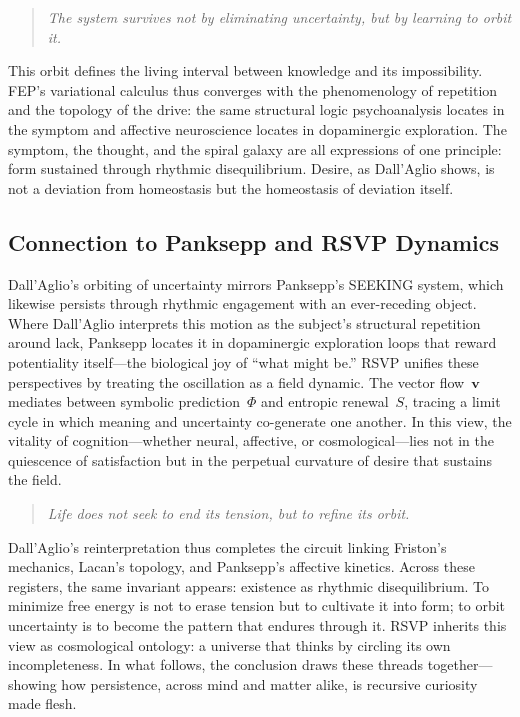 \documentclass[12pt,a4paper]{article}
\begin{document}
\begin{quote}
\textit{The system survives not by eliminating uncertainty, but by learning to orbit it.}
\end{quote}

This orbit defines the living interval between knowledge and its impossibility.  
FEP’s variational calculus thus converges with the phenomenology of repetition and the topology of the drive: the same structural logic psychoanalysis locates in the symptom and affective neuroscience locates in dopaminergic exploration.  
The symptom, the thought, and the spiral galaxy are all expressions of one principle: form sustained through rhythmic disequilibrium.  
Desire, as Dall’Aglio shows, is not a deviation from homeostasis but the homeostasis of deviation itself.

\subsection*{Connection to Panksepp and RSVP Dynamics}

Dall’Aglio’s orbiting of uncertainty mirrors Panksepp’s \textsc{SEEKING} system, which likewise persists through rhythmic engagement with an ever-receding object.  
Where Dall’Aglio interprets this motion as the subject’s structural repetition around lack, Panksepp locates it in dopaminergic exploration loops that reward potentiality itself---the biological joy of “what might be.”  
RSVP unifies these perspectives by treating the oscillation as a field dynamic.  
The vector flow~$\mathbf{v}$ mediates between symbolic prediction~$\Phi$ and entropic renewal~$S$, tracing a limit cycle in which meaning and uncertainty co-generate one another.  
In this view, the vitality of cognition---whether neural, affective, or cosmological---lies not in the quiescence of satisfaction but in the perpetual curvature of desire that sustains the field.

\begin{quote}
\textit{Life does not seek to end its tension, but to refine its orbit.}
\end{quote}

\noindent
Dall’Aglio’s reinterpretation thus completes the circuit linking Friston’s mechanics, Lacan’s topology, and Panksepp’s affective kinetics.  
Across these registers, the same invariant appears: existence as rhythmic disequilibrium.  
To minimize free energy is not to erase tension but to cultivate it into form; to orbit uncertainty is to become the pattern that endures through it.  
RSVP inherits this view as cosmological ontology: a universe that thinks by circling its own incompleteness.  
In what follows, the conclusion draws these threads together---showing how persistence, across mind and matter alike, is recursive curiosity made flesh.
\end{document}
